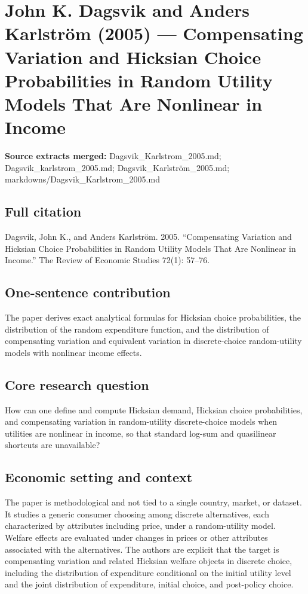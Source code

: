 \documentclass[11pt,a4paper]{article}
\begin{document}
\section*{John K. Dagsvik and Anders Karlström (2005) — Compensating Variation and Hicksian Choice Probabilities in Random Utility Models That Are Nonlinear in Income}

\textbf{Source extracts merged:} Dagsvik\_Karlstrom\_2005.md; Dagsvik\_karlstrom\_2005.md; Dagsvik\_Karlström\_2005.md; markdowns/Dagsvik\_Karlstrom\_2005.md

\subsection*{Full citation}
Dagsvik, John K., and Anders Karlström. 2005. “Compensating Variation and Hicksian Choice Probabilities in Random Utility Models That Are Nonlinear in Income.” The Review of Economic Studies 72(1): 57–76.

\subsection*{One-sentence contribution}
The paper derives exact analytical formulas for Hicksian choice probabilities, the distribution of the random expenditure function, and the distribution of compensating variation and equivalent variation in discrete-choice random-utility models with nonlinear income effects.

\subsection*{Core research question}
How can one define and compute Hicksian demand, Hicksian choice probabilities, and compensating variation in random-utility discrete-choice models when utilities are nonlinear in income, so that standard log-sum and quasilinear shortcuts are unavailable?

\subsection*{Economic setting and context}
The paper is methodological and not tied to a single country, market, or dataset. It studies a generic consumer choosing among discrete alternatives, each characterized by attributes including price, under a random-utility model. Welfare effects are evaluated under changes in prices or other attributes associated with the alternatives. The authors are explicit that the target is compensating variation and related Hicksian welfare objects in discrete choice, including the distribution of expenditure conditional on the initial utility level and the joint distribution of expenditure, initial choice, and post-policy choice.
\end{document}
